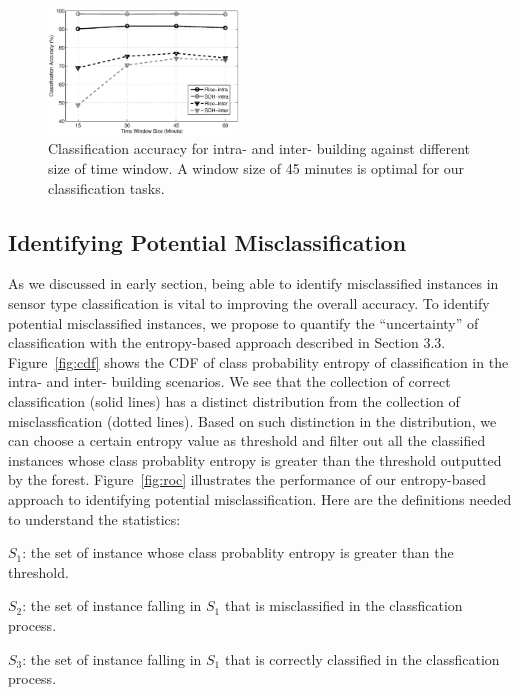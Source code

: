 \begin{figure}[ht!]
\centering
	\includegraphics[width=0.45\textwidth]{./fig/window.eps}
\caption{Classification accuracy for intra- and inter- building against different size of time window. A window size of 45 minutes is optimal for our classification tasks.}
\label{fig:window}
\end{figure}

\subsection{Identifying Potential Misclassification}
As we discussed in early section, being able to identify misclassified instances in sensor type classification is vital to improving the overall accuracy. To identify potential misclassified instances, we propose to quantify the ``uncertainty'' of classification with the entropy-based approach described in Section 3.3. Figure~\ref{fig:cdf} shows the CDF of class probability entropy of classification in the intra- and inter- building scenarios. We see that the collection of correct
classification (solid lines) has a distinct distribution from the collection of misclassfication (dotted lines). Based on such distinction in the distribution, we can choose a certain entropy value as threshold and filter out all the classified instances whose class probablity entropy is greater than the threshold outputted by the forest. Figure~\ref{fig:roc} illustrates the performance of our entropy-based approach to identifying potential misclassification. Here are the definitions needed to understand the statistics:

$S_{1}$: the set of instance whose class probablity entropy is greater than the threshold.

$S_{2}$: the set of instance falling in $S_{1}$ that is misclassified in the classfication process.

$S_{3}$: the set of instance falling in $S_{1}$ that is correctly classified in the classfication process.

